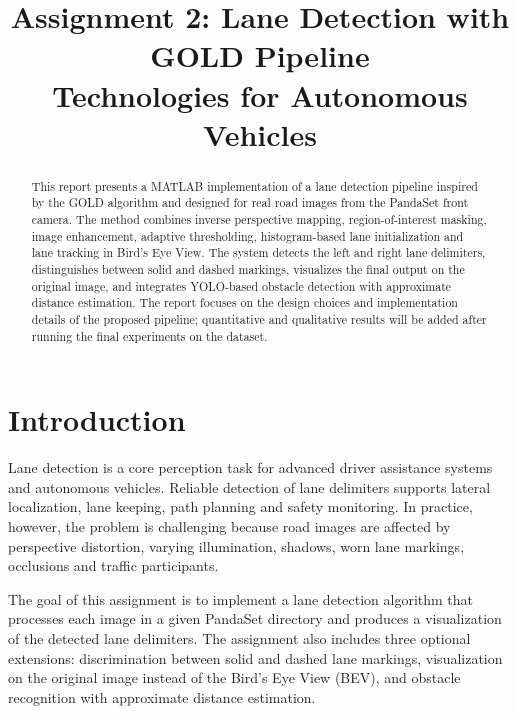 \documentclass[conference]{IEEEtran}
\begin{document}
\pagestyle{plain}

\title{Assignment 2: Lane Detection with GOLD Pipeline \\ Technologies for Autonomous Vehicles}

\author{
}

\maketitle

\begin{abstract}
This report presents a MATLAB implementation of a lane detection pipeline inspired by the GOLD algorithm and designed for real road images from the PandaSet front camera. The method combines inverse perspective mapping, region-of-interest masking, image enhancement, adaptive thresholding, histogram-based lane initialization and lane tracking in Bird's Eye View. The system detects the left and right lane delimiters, distinguishes between solid and dashed markings, visualizes the final output on the original image, and integrates YOLO-based obstacle detection with approximate distance estimation. The report focuses on the design choices and implementation details of the proposed pipeline; quantitative and qualitative results will be added after running the final experiments on the dataset.
\end{abstract}

\section{Introduction}
Lane detection is a core perception task for advanced driver assistance systems and autonomous vehicles. Reliable detection of lane delimiters supports lateral localization, lane keeping, path planning and safety monitoring. In practice, however, the problem is challenging because road images are affected by perspective distortion, varying illumination, shadows, worn lane markings, occlusions and traffic participants.

The goal of this assignment is to implement a lane detection algorithm that processes each image in a given PandaSet directory and produces a visualization of the detected lane delimiters. The assignment also includes three optional extensions: discrimination between solid and dashed lane markings, visualization on the original image instead of the Bird's Eye View (BEV), and obstacle recognition with approximate distance estimation.
\end{document}
